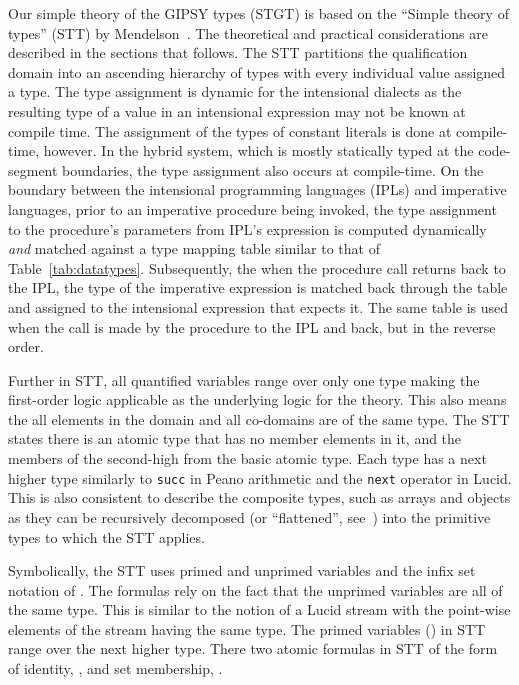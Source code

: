 \documentclass{easychair}
\newcommand{\xt}[1]{Table~\ref{#1}}
\newcommand{\ipl}{{IPL\index{IPL}}}
\newcommand{\lucid}{{Lucid\index{Lucid}}}
\newcommand{\api}[1]{\texttt{#1}\index{API!#1}}
\begin{document}
Our simple theory of the GIPSY types (STGT) is based on the
``Simple theory of types'' (STT) by Mendelson~\cite{math-logic-97}.
The theoretical and practical considerations are described in the sections
that follows. The STT partitions the qualification domain into
an ascending hierarchy of types with every individual
value assigned a type. The type assignment is dynamic
for the intensional dialects as the resulting type of
a value in an intensional expression may not be known
at compile time. The assignment of the types of constant literals
is done at compile-time, however. In the hybrid system,
which is mostly statically typed at the code-segment boundaries, the type assignment
also occurs at compile-time. On the boundary between the
intensional programming languages ({\ipl}s) and imperative languages, prior to an imperative procedure
being invoked, the type assignment to the procedure's parameters
from IPL's expression is computed dynamically {\em and} matched
against a type mapping table similar to that of \xt{tab:datatypes}.
Subsequently, the when the procedure call returns back to the IPL,
the type of the imperative expression is matched back through
the table and assigned to the intensional expression that expects it.
The same table is used when the call is made by the procedure
to the IPL and back, but in the reverse order.

Further in STT, all quantified
variables range over only one type making the first-order logic
applicable as the underlying logic for the theory. This also means
the all elements in the domain and all co-domains are of the same
type. The STT states there is an atomic type that has no member
elements in it, and the members of the second-high from the
basic atomic type. Each type has a next higher type similarly
to \api{succ} in Peano arithmetic and the \api{next} operator
in {\lucid}. This is also consistent to describe the composite
types, such as arrays and objects as they can be recursively
decomposed (or ``flattened'', see~\cite{mokhovmcthesis05}) into the primitive
types to which the STT applies.

Symbolically, the STT uses primed and unprimed variables and the
infix set notation of . The formulas  rely on the
fact that the unprimed variables are all of the same type. This
is similar to the notion of a Lucid stream with the point-wise
elements of the stream having the same type. The primed variables ()
in STT range over the next higher type. There two atomic formulas
in STT of the form of identity, , and set membership, .
\end{document}
